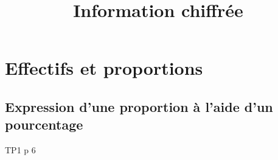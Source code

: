 \documentclass[12pt,a4paper]{article}
\date{}
\title{Information chiffrée }
\begin{document}

\setlength{\tabcolsep}{5pt}





\section{Effectifs et proportions}

\subsection{Expression d'une proportion à l'aide d'un pourcentage}

TP1 p 6
\end{document}
